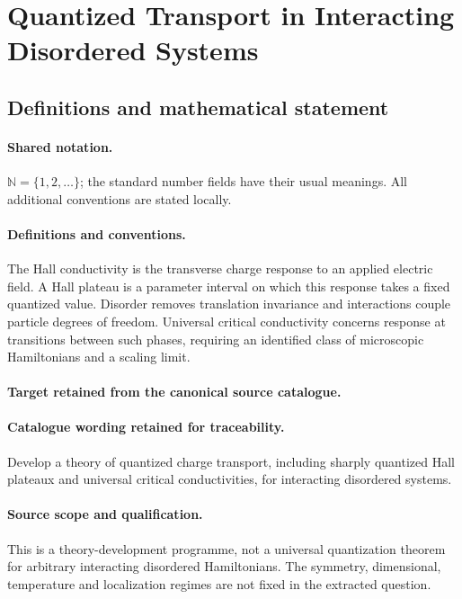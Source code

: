 \documentclass[11pt]{article}
\begin{document}
\section{Quantized Transport in Interacting Disordered Systems}\label{statement}

\subsection{Definitions and mathematical statement}

\paragraph{Shared notation.}$\mathbb N=\{1,2,\ldots\}$; the standard number fields have their usual meanings. All additional conventions are stated locally.


\paragraph{Definitions and conventions.}
The Hall conductivity is the transverse charge response to an applied electric field. A Hall plateau is a parameter interval on which this response takes a fixed quantized value. Disorder removes translation invariance and interactions couple particle degrees of freedom. Universal critical conductivity concerns response at transitions between such phases, requiring an identified class of microscopic Hamiltonians and a scaling limit.

\paragraph{Target retained from the canonical source catalogue.}
\paragraph{Catalogue wording retained for traceability.}
Develop a theory of quantized charge transport, including sharply quantized Hall plateaux and universal critical conductivities, for interacting disordered systems.

\paragraph{Source scope and qualification.}
This is a theory-development programme, not a universal quantization theorem for arbitrary interacting disordered Hamiltonians. The symmetry, dimensional, temperature and localization regimes are not fixed in the extracted question.
\end{document}
